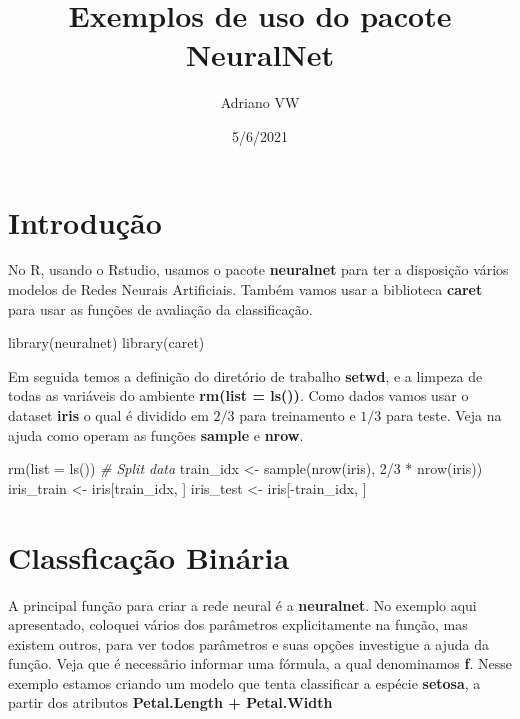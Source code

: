 \documentclass[
]{article}
\title{Exemplos de uso do pacote NeuralNet}
\author{Adriano VW}
\date{5/6/2021}
\newenvironment{Shaded}{\begin{snugshade}}{\end{snugshade}}
\newcommand{\AttributeTok}[1]{\textcolor[rgb]{0.77,0.63,0.00}{#1}}
\newcommand{\CommentTok}[1]{\textcolor[rgb]{0.56,0.35,0.01}{\textit{#1}}}
\newcommand{\DecValTok}[1]{\textcolor[rgb]{0.00,0.00,0.81}{#1}}
\newcommand{\FunctionTok}[1]{\textcolor[rgb]{0.00,0.00,0.00}{#1}}
\newcommand{\NormalTok}[1]{#1}
\newcommand{\OtherTok}[1]{\textcolor[rgb]{0.56,0.35,0.01}{#1}}
\newcommand{\SpecialCharTok}[1]{\textcolor[rgb]{0.00,0.00,0.00}{#1}}
\begin{document}
\maketitle

\hypertarget{introduuxe7uxe3o}{%
\section{Introdução}\label{introduuxe7uxe3o}}

No R, usando o Rstudio, usamos o pacote \textbf{neuralnet} para ter a
disposição vários modelos de Redes Neurais Artificiais. Também vamos
usar a biblioteca \textbf{caret} para usar as funções de avaliação da
classificação.

\begin{Shaded}
\begin{Highlighting}[]
\FunctionTok{library}\NormalTok{(neuralnet)}
\FunctionTok{library}\NormalTok{(caret)}
\end{Highlighting}
\end{Shaded}

Em seguida temos a definição do diretório de trabalho \textbf{setwd}, e
a limpeza de todas as variáveis do ambiente \textbf{rm(list = ls())}.
Como dados vamos usar o dataset \textbf{iris} o qual é dividido em
\(2/3\) para treinamento e \(1/3\) para teste. Veja na ajuda como operam
as funções \textbf{sample} e \textbf{nrow}.

\begin{Shaded}
\begin{Highlighting}[]
\FunctionTok{rm}\NormalTok{(}\AttributeTok{list =} \FunctionTok{ls}\NormalTok{())}
\CommentTok{\# Split data}
\NormalTok{train\_idx }\OtherTok{\textless{}{-}} \FunctionTok{sample}\NormalTok{(}\FunctionTok{nrow}\NormalTok{(iris), }\DecValTok{2}\SpecialCharTok{/}\DecValTok{3} \SpecialCharTok{*} \FunctionTok{nrow}\NormalTok{(iris))}
\NormalTok{iris\_train }\OtherTok{\textless{}{-}}\NormalTok{ iris[train\_idx, ]}
\NormalTok{iris\_test }\OtherTok{\textless{}{-}}\NormalTok{ iris[}\SpecialCharTok{{-}}\NormalTok{train\_idx, ]}
\end{Highlighting}
\end{Shaded}

\hypertarget{classficauxe7uxe3o-binuxe1ria}{%
\section{Classficação Binária}\label{classficauxe7uxe3o-binuxe1ria}}

A principal função para criar a rede neural é a \textbf{neuralnet}. No
exemplo aqui apresentado, coloquei vários dos parâmetros explicitamente
na função, mas existem outros, para ver todos parâmetros e suas opções
investigue a ajuda da função. Veja que é necessãrio informar uma
fórmula, a qual denominamos \textbf{f}. Nesse exemplo estamos criando um
modelo que tenta classificar a espécie \textbf{setosa}, a partir dos
atributos \textbf{Petal.Length + Petal.Width}
\end{document}
